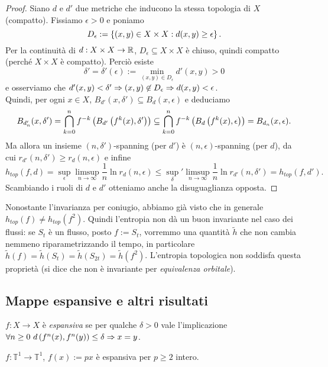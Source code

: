 \begin{proof}Siano $d$ e $d'$ due metriche che inducono la stessa topologia di $X$ (compatto).
Fissiamo $\epsilon>0$ e poniamo
\[ D_\epsilon:=\left\{(x,y)\in X\times X:d(x,y)\ge\epsilon\right\}. \]
Per la continuità di $d:X\times X\to\mathbb{R}$, $D_\epsilon\subseteq X\times X$ è chiuso, quindi compatto (perché $X\times X$ è compatto).
Perciò esiste
\[ \delta'=\delta'(\epsilon):=\min_{(x,y)\in D_\epsilon}d'(x,y)>0 \]
e osserviamo che $d'(x,y)<\delta'\Rightarrow (x,y)\not\in D_\epsilon\Rightarrow d(x,y)<\epsilon$. \\
Quindi, per ogni $x\in X$, $B_{d'}(x,\delta')\subseteq B_d(x,\epsilon)$ e deduciamo
\[ B_{d'_n}(x,\delta')=\bigcap_{k=0}^n f^{-k}\left(B_{d'}\left(f^k(x),\delta'\right)\right)\subseteq\bigcap_{k=0}^n f^{-k}\left(B_d\left(f^k(x),\epsilon\right)\right)
=B_{d_n}(x,\epsilon). \]
Ma allora un insieme $(n,\delta')$-spanning (per $d'$) è $(n,\epsilon)$-spanning (per $d$), da cui
$r_{d'}(n,\delta')\ge r_d(n,\epsilon)$ e infine
\[ h_{top}(f,d)=\sup_\epsilon \limsup_{n\to\infty}\frac{1}{n}\ln r_d(n,\epsilon)
\le \sup_\delta'\limsup_{n\to\infty}\frac{1}{n}\ln r_{d'}(n,\delta')=h_{top}(f,d'). \]
Scambiando i ruoli di $d$ e $d'$ otteniamo anche la disuguaglianza opposta.
\end{proof}

\begin{oss}Nonostante l'invarianza per coniugio, abbiamo già visto che in generale $h_{top}(f)\neq h_{top}(f^2)$.
Quindi l'entropia non dà un buon invariante nel caso dei flussi: se $S_t$ è un flusso, posto $f:=S_t$, vorremmo
una quantità $\tilde{h}$ che non cambia nemmeno riparametrizzando il tempo, in particolare
$\tilde{h}(f)=\tilde{h}(S_t)=\tilde{h}(S_{2t})=\tilde{h}(f^2)$.
L'entropia topologica non soddisfa questa proprietà (si dice che non è invariante per \emph{equivalenza orbitale}).
\end{oss}

\subsection{Mappe espansive e altri risultati}

\begin{defi}$f:X\to X$ è \emph{espansiva} se per qualche $\delta>0$ vale l'implicazione
$\forall n\ge 0\ d\pa{f^n(x),f^n(y)}\le\delta\implica x=y$.
\end{defi}

\begin{esempio}$f:\mathbb{T}^1\to\mathbb{T}^1$, $f(x):=px$ è espansiva per $p\ge 2$ intero.
\end{esempio}

